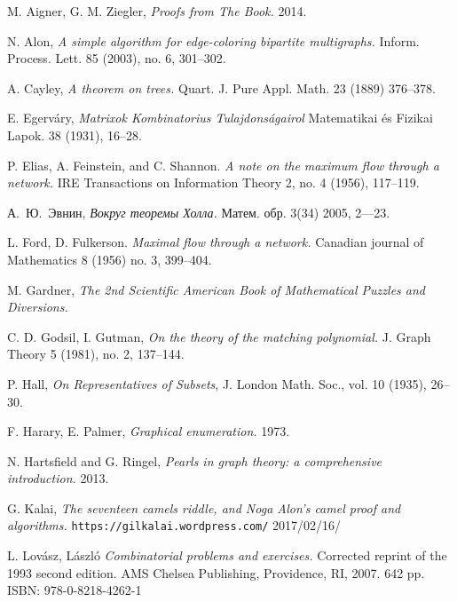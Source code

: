 \begin{thebibliography}{52}

 M. Aigner, G. M. Ziegler,  \emph{Proofs from The Book.} 2014.

 N. Alon,
\emph{A simple algorithm for edge-coloring bipartite multigraphs.}
Inform. Process. Lett. 85 (2003), no. 6, 301--302. 

A. Cayley, \emph{A theorem on trees.} Quart. J. Pure Appl. Math. 23 (1889) 376--378.

E. Egerv\'ary, 
\emph{Matrixok Kombinatorius Tulajdons\'agairol}
Matematikai \'es Fizikai Lapok. 38 (1931), 16--28.

 P. Elias, A. Feinstein, and C. Shannon. 
\emph{A note on the maximum flow through a network.}
IRE Transactions on Information Theory 2, no. 4 (1956), 117--119.

 \begin{otherlanguage}{russian}
А.~Ю.~Эвнин,
\emph{Вокруг теоремы Холла.} Матем. обр. 3(34) 2005, 2---23.
 \end{otherlanguage}

 L. Ford, D. Fulkerson. 
\emph{Maximal flow through a network.} 
Canadian journal of Mathematics 8 (1956) no. 3, 399--404.

 M. Gardner, \emph{The 2nd Scientific American Book of Mathematical Puzzles and Diversions.}

C. D. Godsil, I. Gutman, 
\emph{On the theory of the matching polynomial.}
J. Graph Theory 5 (1981), no. 2, 137–144.

P. Hall, 
\emph{On Representatives of Subsets}, 
J. London Math. Soc., vol. 10 (1935), 26--30.

 F. Harary, E. Palmer, 
\emph{Graphical enumeration.} 1973.

 N. Hartsfield and  G. Ringel, 
\emph{Pearls in graph theory: a comprehensive introduction.} 2013.

 G. Kalai, 
\emph{The seventeen camels riddle, and Noga Alon’s camel proof and algorithms.}
\texttt{https://gilkalai.wordpress.com/} 2017/02/16/

 L. Lov\'asz, L\'aszl\'o \emph{Combinatorial problems and exercises.} Corrected reprint of the 1993 second edition. AMS Chelsea Publishing, Providence, RI, 2007. 642 pp. ISBN: 978-0-8218-4262-1


\end{thebibliography}
